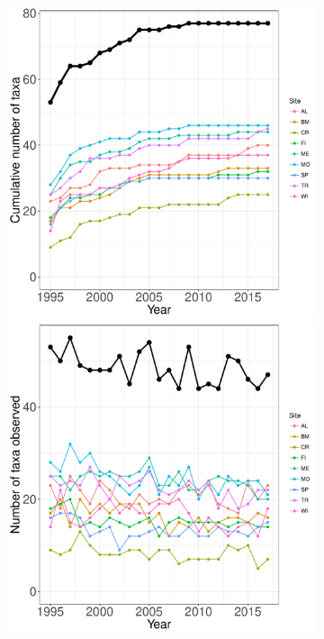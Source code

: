 \documentclass[11pt, oneside]{article}
\begin{document}
\begin{figure}[h!]
\begin{figure}[h!]
\centering
\includegraphics[scale = 0.4]{ntl-fish-stanleyLottig_species_accumulation_curve.pdf}
\includegraphics[scale = 0.4]{ntl-fish-stanleyLottig_num_taxa_over_time.pdf}

\end{figure}
\end{figure}
\end{document}
